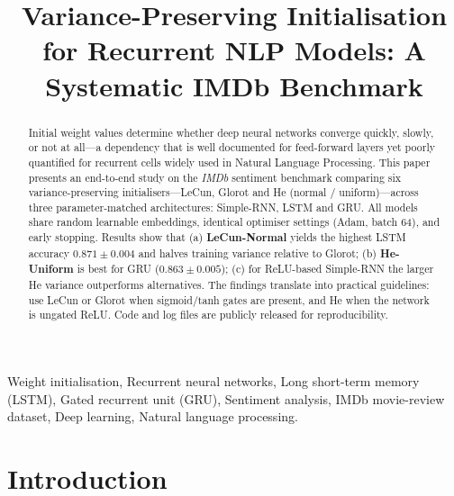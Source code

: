 \documentclass[conference]{IEEEtran}
\begin{document}
\title{Variance-Preserving Initialisation for Recurrent NLP Models: A Systematic IMDb Benchmark
}

\author{
\and
}


\maketitle 

\begin{abstract}
Initial weight values determine whether deep neural networks converge quickly, slowly, or not at all—a dependency that is well documented for feed-forward layers yet poorly quantified for recurrent cells widely used in Natural Language Processing.  This paper presents an end-to-end study on the \emph{IMDb} sentiment benchmark comparing six variance-preserving initialisers—LeCun, Glorot and He (normal / uniform)—across three parameter-matched architectures: Simple-RNN, LSTM and GRU.  All models share random learnable embeddings, identical optimiser settings (Adam, batch 64), and early stopping.  Results show that
(a) \textbf{LeCun-Normal} yields the highest LSTM accuracy
\(0.871\!\pm\!0.004\) and halves training variance relative to Glorot;  
(b) \textbf{He-Uniform} is best for GRU (\(0.863\pm0.005\));  
(c) for ReLU-based Simple-RNN the larger He variance outperforms alternatives. The findings translate into practical guidelines: use LeCun or Glorot when sigmoid/tanh gates are present, and He when the network is ungated ReLU.  
Code and log files are publicly released for
reproducibility.
\end{abstract}


\begin{IEEEkeywords}
Weight initialisation, Recurrent neural networks, Long short-term memory (LSTM), Gated recurrent unit (GRU), Sentiment analysis, IMDb movie-review dataset, Deep learning, Natural language processing.
\end{IEEEkeywords}

\section{Introduction}\label{sec:intro}
\end{document}

